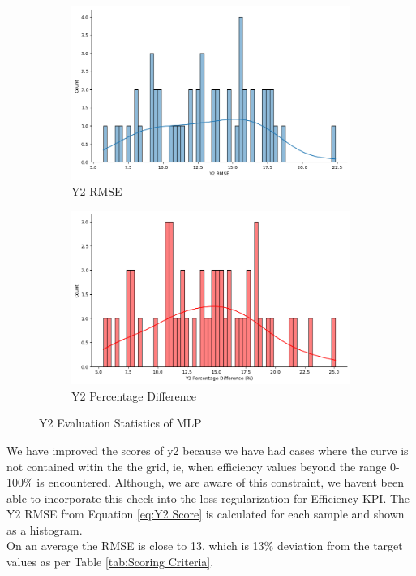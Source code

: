 \documentclass{report} %
\begin{document}
\begin{figure}[H]
    \centering
    \begin{subfigure}{0.5\textwidth}
        \centering
        \includegraphics[width=\textwidth]{./ReportImages/score_MLP_y2.png}
        \caption{Y2 \ac{RMSE}}
        \label{fig:Y2 RMSE}
    \end{subfigure}\hfill
    \begin{subfigure}{0.5\textwidth}
        \centering
        \includegraphics[width=\textwidth]{./ReportImages/percentage_diff_MLP_y2.png}
        \caption{Y2 Percentage Difference}
        \label{fig:Y2 Percentage Difference}
    \end{subfigure}
    \caption{Y2 Evaluation Statistics of \ac{MLP}}
    \label{fig:Y2 Evaluation Statistics MLP}
\end{figure}

We have improved the scores of y2 because we have had cases where the curve is not contained witin the the grid, ie, when efficiency values beyond the range 0-100\% is encountered.
Although, we are aware of this constraint, we havent been able to incorporate this check into the loss regularization for Efficiency \ac{KPI}.
The Y2 \ac{RMSE} from Equation \ref{eq:Y2 Score} is calculated for each sample and shown as a histogram.\\
On an average the \ac{RMSE} is close to 13, which is 13\% deviation from the target values as per Table \ref{tab:Scoring Criteria}.\\
\end{document}
